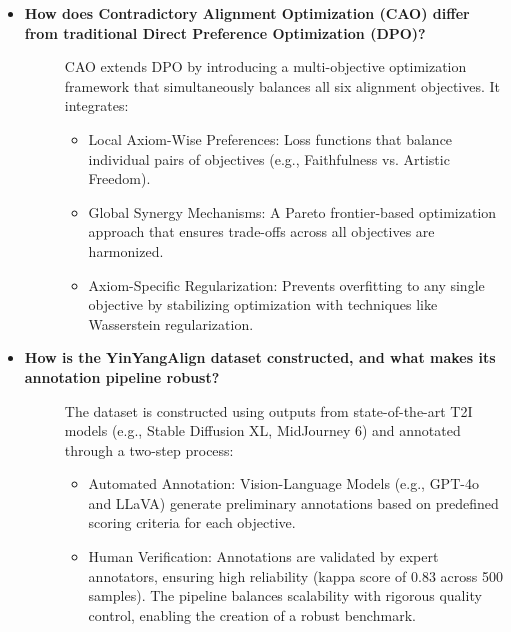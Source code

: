 \begin{itemize}[leftmargin=15pt,nolistsep]
\item[\ding{93}] { \selectfont \textbf{How does Contradictory Alignment Optimization (CAO) differ from traditional Direct Preference Optimization (DPO)?}}
\vspace{0mm}
\begin{description}
\item[] CAO extends DPO by introducing a multi-objective optimization framework that simultaneously balances all six alignment objectives. It integrates:
\begin{itemize}
    \item Local Axiom-Wise Preferences: Loss functions that balance individual pairs of objectives (e.g., Faithfulness vs. Artistic Freedom).
    \item Global Synergy Mechanisms: A Pareto frontier-based optimization approach that ensures trade-offs across all objectives are harmonized.
    \item Axiom-Specific Regularization: Prevents overfitting to any single objective by stabilizing optimization with techniques like Wasserstein regularization.
\end{itemize}

\end{description}



\item[\ding{93}] { \selectfont \textbf{How is the YinYangAlign dataset constructed, and what makes its annotation pipeline robust?}}
\vspace{0mm}
\begin{description}
\item[] The dataset is constructed using outputs from state-of-the-art T2I models (e.g., Stable Diffusion XL, MidJourney 6) and annotated through a two-step process:
\begin{itemize}
    \item Automated Annotation: Vision-Language Models (e.g., GPT-4o and LLaVA) generate preliminary annotations based on predefined scoring criteria for each objective.
    \item Human Verification: Annotations are validated by expert annotators, ensuring high reliability (kappa score of 0.83 across 500 samples). The pipeline balances scalability with rigorous quality control, enabling the creation of a robust benchmark.
\end{itemize}
\end{description}


\end{itemize}
